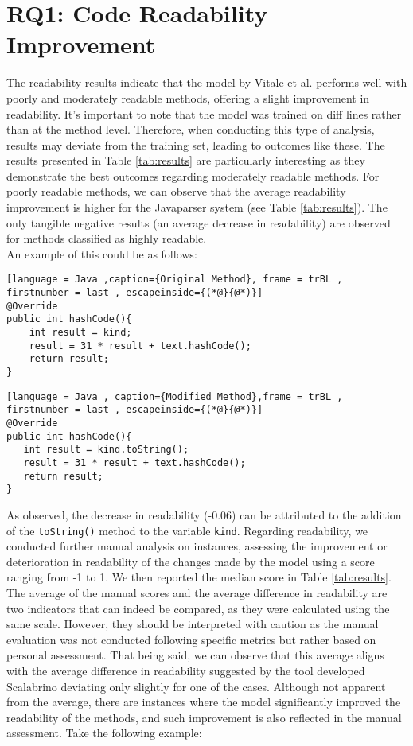 \section{RQ1: Code Readability Improvement}
The readability results indicate that the model by Vitale et al. \cite{Vitale2023} performs well with poorly and moderately readable methods, offering a slight improvement in readability. It's important to note that the model was trained on diff lines rather than at the method level. Therefore, when conducting this type of analysis, results may deviate from the training set, leading to outcomes like these. The results presented in Table \ref{tab:results} are particularly interesting as they demonstrate the best outcomes regarding moderately readable methods. For poorly readable methods, we can observe that the average readability improvement is higher for the Javaparser system (see Table \ref{tab:results}). The only tangible negative results (an average decrease in readability) are observed for methods classified as highly readable.\\
An example of this could be as follows:
\begin{lstlisting}[language = Java ,caption={Original Method}, frame = trBL , firstnumber = last , escapeinside={(*@}{@*)}]
@Override
public int hashCode(){
    int result = kind;
    result = 31 * result + text.hashCode();
    return result;
}
\end{lstlisting}
\begin{lstlisting}[language = Java , caption={Modified Method},frame = trBL , firstnumber = last , escapeinside={(*@}{@*)}]
@Override 
public int hashCode(){ 
   int result = kind.toString(); 
   result = 31 * result + text.hashCode(); 
   return result; 
}
\end{lstlisting}
As observed, the decrease in readability (-0.06) can be attributed to the addition of the \texttt{toString()} method to the variable \texttt{kind}. Regarding readability, we conducted further manual analysis on instances, assessing the improvement or deterioration in readability of the changes made by the model using a score ranging from -1 to 1. We then reported the median score in Table \ref{tab:results}. The average of the manual scores and the average difference in readability are two indicators that can indeed be compared, as they were calculated using the same scale. However, they should be interpreted with caution as the manual evaluation was not conducted following specific metrics but rather based on personal assessment. That being said, we can observe that this average aligns with the average difference in readability suggested by the tool developed Scalabrino \etal \cite{Scalabrino2018} deviating only slightly for one of the cases. Although not apparent from the average, there are instances where the model significantly improved the readability of the methods, and such improvement is also reflected in the manual assessment. Take the following example:
